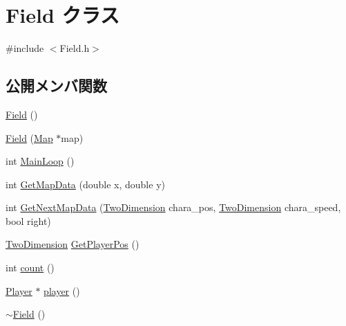 \hypertarget{class_field}{\section{Field クラス}
\label{class_field}
}


{\ttfamily \#include $<$Field.\+h$>$}

\subsection*{公開メンバ関数}
\begin{DoxyCompactItemize}
\item 
\hyperlink{class_field_a3e804c92273d9159f413f227b535c672}{Field} ()
\item 
\hyperlink{class_field_ac3b19f4f5451b19638479e4e6302a465}{Field} (\hyperlink{class_map}{Map} $\ast$map)
\item 
int \hyperlink{class_field_abe0201576e9a90b0c971d0531a834fe0}{Main\+Loop} ()
\item 
int \hyperlink{class_field_aef2ba50ec80860898b18cc14f76821bb}{Get\+Map\+Data} (double x, double y)
\item 
int \hyperlink{class_field_a42b76e7d36c36525c8f23da05f5ef451}{Get\+Next\+Map\+Data} (\hyperlink{struct_two_dimension}{Two\+Dimension} chara\+\_\+pos, \hyperlink{struct_two_dimension}{Two\+Dimension} chara\+\_\+speed, bool right)
\item 
\hyperlink{struct_two_dimension}{Two\+Dimension} \hyperlink{class_field_a701edaa0540555c8087df537402e5e22}{Get\+Player\+Pos} ()
\item 
int \hyperlink{class_field_a7fd8d8172b36ef5f764e9b98b178c8eb}{count} ()
\item 
\hyperlink{class_player}{Player} $\ast$ \hyperlink{class_field_aa135a6f54b5b6779b36e147e46c70696}{player} ()
\item 
\hyperlink{class_field_a45d6e6d09b8f8e46de62b40119d62c60}{$\sim$\+Field} ()
\end{DoxyCompactItemize}
